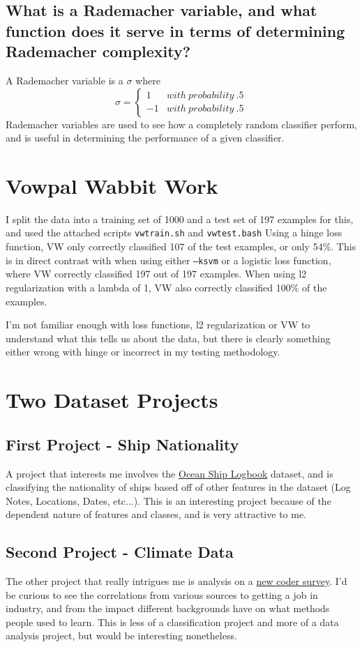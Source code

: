 \documentclass{article}
\begin{document}
\subsection{What is a Rademacher variable, and what function does it serve in terms of determining Rademacher complexity?}
A Rademacher variable is a $\sigma$ where \[ \sigma = \begin{cases} 
      1 & with\: probability\: .5 \\
      -1 & with\: probability\: .5  
   \end{cases}
\]
Rademacher variables are used to see how a completely random classifier perform, and is useful in determining the performance of a given classifier.  

\section{Vowpal Wabbit Work}
I split the data into a training set of 1000 and a test set of 197 examples for this, and used the attached scripts \texttt{vwtrain.sh} and \texttt{vwtest.bash} Using a hinge loss function, VW only correctly classified 107 of the test examples, or only 54\%. This is in direct contrast with when using either \texttt{--ksvm} or a logistic loss function, where VW correctly classified 197 out of 197 examples. When using l2 regularization with a lambda of 1, VW also correctly classified 100\% of the examples.

I'm not familiar enough with loss functions, l2 regularization or VW to understand what this tells us about the data, but there is clearly something either wrong with hinge or incorrect in my testing methodology. 

\section{Two Dataset Projects}
\subsection{First Project - Ship Nationality}
A project that interests me involves the \href{https://www.kaggle.com/kaggle/climate-data-from-ocean-ships}{Ocean Ship Logbook} dataset, and is classifying the nationality of ships based off of other features in the dataset (Log Notes, Locations, Dates, etc...). This is an interesting project because of the dependent nature of features and classes, and is very attractive to me. 

\subsection{Second Project - Climate Data}
The other project that really intrigues me is analysis on a \href{https://www.kaggle.com/freecodecamp/2016-new-coder-survey-}{new coder survey}. I'd be curious to see the correlations from various sources to getting a job in industry, and from the impact different backgrounds have on what methods people used to learn. This is less of a classification project and more of a data analysis project, but would be interesting nonetheless.  
\end{document}
